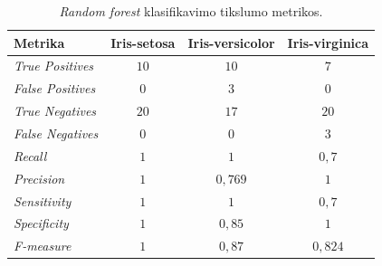 \begin{table}[H]
    \centering
    \caption{\textit{Random forest} klasifikavimo tikslumo metrikos.}
    \begin{tabular}{|l|c|c|c|}
        \hline
        \textbf{Metrika} & \textbf{Iris-setosa} & \textbf{Iris-versicolor} & \textbf{Iris-virginica} \\
        \hline
        \textit{True Positives}   & $10$  & $10$  & $7$ \\ \hline
        \textit{False Positives}  & $0$  & $3$   & $0$  \\ \hline
        \textit{True Negatives}   & $20$ & $17$  & $20$ \\ \hline
        \textit{False Negatives}  & $0$  & $0$   & $3$  \\ \hline
        \textit{Recall}           & $1$  & $1$       & $0{,}7$ \\ \hline
        \textit{Precision}        & $1$  & $0{,}769$ & $1$ \\ \hline
        \textit{Sensitivity}      & $1$  & $1$       & $0{,}7$ \\ \hline
        \textit{Specificity}      & $1$  & $0{,}85$ & $1$ \\ \hline
        \textit{F-measure}        & $1$  & $0{,}87$ & $0{,}824$ \\ \hline
    \end{tabular}
    \label{tab:random_forest_klasifikavimo_metrikos}
\end{table}